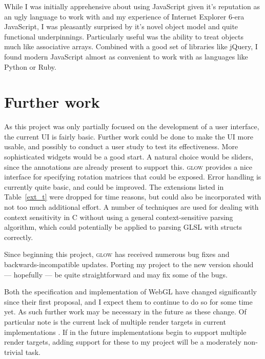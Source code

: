 \documentclass[12pt,twoside,notitlepage]{report}
\begin{document}
While I was initially apprehensive about using JavaScript given it's reputation as an ugly language to work with and my experience of Internet Explorer 6-era JavaScript, I was pleasantly surprised by it's novel object model and quite functional underpinnings. Particularly useful was the ability to treat objects much like associative arrays. Combined with a good set of libraries like jQuery, I found modern JavaScript almost as convenient to work with as languages like Python or Ruby.

\section{Further work}
As this project was only partially focused on the development of a user interface, the current UI is fairly basic. Further work could be done to make the UI more usable, and possibly to conduct a user study to test its effectiveness. More sophisticated widgets would be a good start. A natural choice would be sliders, since the annotations are already present to support this. \textsc{glow} provides a nice interface for specifying rotation matrices that could be exposed. Error handling is currently quite basic, and could be improved. The extensions listed in Table~\ref{ext_t} were dropped for time reasons, but could also be incorporated with not too much additional effort. A number of techniques are used for dealing with context sensitivity in C without using a general context-sensitive parsing algorithm, which could potentially be applied to parsing GLSL with structs correctly.

Since beginning this project, \textsc{glow} has received numerous bug fixes and backwards-incompatible updates. Porting my project to the new version should --- hopefully --- be quite straightforward and may fix some of the bugs. 

Both the specification and implementation of WebGL have changed significantly since their first proposal, and I expect them to continue to do so for some time yet. As such further work may be necessary in the future as these change. Of particular note is the current lack of multiple render targets in current implementations \citep{webgl-future}. If in the future implementations begin to support multiple render targets, adding support for these to my project will be a moderately non-trivial task.

\cleardoublepage

\end{document}
